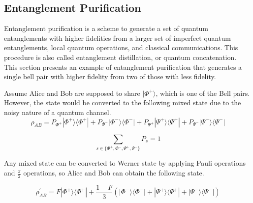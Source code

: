 \subsection{Entanglement Purification}

Entanglement purification is a scheme to generate a set of quantum entanglements with higher fidelities from a larger set of imperfect quantum entanglements, local quantum operations, and classical communications.
This procedure is also called entanglement distillation, or quantum concatenation. This section presents an example of entanglement purification that generates a single bell pair with higher fidelity from two of those with less fidelity.

Assume Alice and Bob are supposed to share $|\Phi^+\rangle$, which is one of the Bell pairs. However, the state would be converted to the following mixed state due to the noisy nature of a quantum channel.
$$ \rho_{AB} = P_{\Phi^+}|\Phi^+\rangle\langle\Phi^+| + P_{\Phi^-}|\Phi^-\rangle\langle\Phi^-| + P_{\Psi^+}|\Psi^+\rangle\langle\Psi^+| + P_{\Psi^-}|\Psi^-\rangle\langle\Psi^-|$$

$$\sum_{s \in \{\Phi^+, \Phi^-, \Psi^+, \Psi^- \}} P_{s} = 1$$

Any mixed state can be converted to Werner state by applying Pauli operations and $\frac{\pi}{2}$ operations, so Alice and Bob can obtain the following state.

$$ \rho^{'}_{AB} = F|\Phi^+\rangle\langle\Phi^+| + \frac{1-F}{3}(|\Phi^-\rangle\langle\Phi^-| + |\Psi^+\rangle\langle\Psi^+| + |\Psi^-\rangle\langle\Psi^-|)$$

